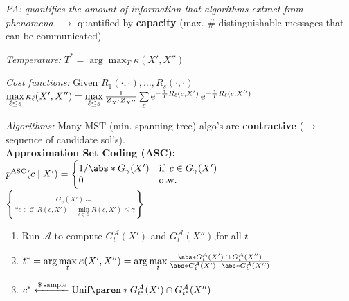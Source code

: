 \emph{PA:}\enskip
\textit{quantifies the amount of information that algorithms extract from phenomena.}
$\to$ quantified by \textbf{capacity} (max. \# distinguishable messages that can be communicated)

\emph{Temperature:}\enspace
$T^\ast = \arg\max_T \kappa(X',X'')$

\emph{Cost functions:}\enspace
Given $R_1(\cdot,\cdot),\ldots,R_s(\cdot,\cdot)$\\
$\max\limits_{\ell\leq s} \kappa_\ell(X',X'') = \max\limits_{\ell\leq s} \frac{1}{Z_{X'} Z_{X''}} \sum\limits_c \operatorname{e}^{-\frac1T R_\ell(c,X')} \operatorname{e}^{-\frac1T R_\ell(c,X'')}$

\emph{Algorithms:}\enspace
Many MST (min. spanning tree) algo's are \textbf{contractive} ($\to$ sequence of candidate sol's).
\\
\textbf{Approximation Set Coding (ASC):}\\
\quad $p\ap{ASC}(c\mid X') = \begin{cases}
    1 / \abs*{G_\gamma(X')}  & \text{if}\enspace c\in G_\gamma(X') \\[-2pt]
    0   & \text{otw.}
\end{cases}$\\
\quad $G_\gamma(X') \coloneqq \brace*{ c\in\mathcal C : R(c,X') - \min\limits_{c\in\mathcal C} R(c,X') \leq \gamma }$
\begin{enumerate}
    \item Run $\mathcal A$ to compute $G_t^{\mathcal A}(X')$ and $G_t^{\mathcal A}(X'')$,\enspace for all $t$
    \vspace{2pt}
    \item $t^\ast = \arg\max\limits_t \kappa(X',X'')
        = \arg\max\limits_t \frac{\abs*{G_t^{\mathcal A}(X') \:\cap\: G_t^{\mathcal A}(X'')}}{\abs*{G_t^{\mathcal A}(X')} \:\cdot\: \abs*{G_t^{\mathcal A}(X'')}}$
    \item $c^\ast \xleftarrow{\$\:\text{sample}} \mathrm{Unif}\paren*{G_{t^\ast}^{\mathcal A}(X') \cap G_{t^\ast}^{\mathcal A}(X'')}$
\end{enumerate}


